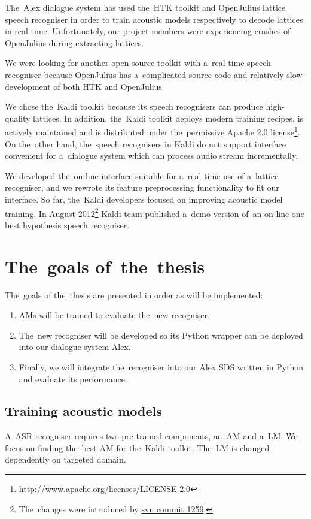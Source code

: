 The~Alex dialogue system has used the~\ac{HTK} toolkit\cite{young94htk} and OpenJulius\cite{lee2009julius} lattice speech recogniser in order to train acoustic models respectively to decode lattices in real time. 
Unfortunately, our project members were experiencing crashes of OpenJulius during extracting lattices.

We were looking for another open source toolkit with a~real-time speech recogniser because OpenJulius has a~complicated source code and relatively slow development of both \ac{HTK} and OpenJulius

We chose the~Kaldi toolkit because its speech recognisers can produce high-quality lattices.\cite{povey2012generating}
In addition, the~Kaldi toolkit deploys modern training recipes, is actively maintained and is distributed under the~permissive Apache 2.0 license\footnote{\url{http://www.apache.org/licenses/LICENSE-2.0}}.
On the~other hand, the~speech recognisers in Kaldi do not support interface convenient for a~dialogue system which can process audio stream incrementally.

We developed the~on-line interface suitable for a~real-time use of a~lattice recogniser, and we rewrote its feature preprocessing functionality to fit our interface.
So far, the~Kaldi developers focused on improving acoustic model training. 
In August 2012\footnote{The~changes were introduced by \href{https://sourceforge.net/p/kaldi/code/1259/}{svn commit 1259}.} Kaldi team published a~demo version of~an on-line one best hypothesis speech recogniser.

\section{The~goals of~the~thesis} 
\label{sec:goals}
The~goals of the~thesis are presented in order as will be implemented:
\begin{enumerate}
    \item \acp{AM} will be trained to evaluate the~new recogniser.
    \item The~new recogniser will be developed so its Python wrapper can be deployed into our dialogue system Alex.
    \item Finally, we will integrate the~recogniser into our Alex \ac{SDS} written in Python and evaluate its performance.
\end{enumerate}

\subsection{Training acoustic models} 
\label{sub:training_kaldi_acoustic_models}
A~\acl{ASR} recogniser requires two pre trained components, an~\acl{AM} and a~\acl{LM}. 
We focus on finding the~best \acl{AM} for the~Kaldi toolkit. 
The~\acl{LM} is changed dependently on targeted domain.

